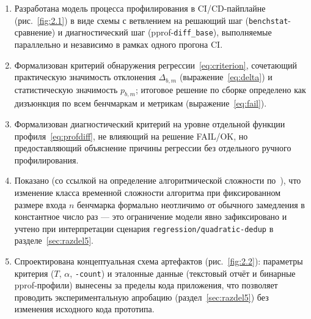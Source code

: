 \begin{enumerate}
\item Разработана модель процесса профилирования в CI/CD-пайплайне
(рис.~\ref{fig:2.1}) в виде схемы с ветвлением на решающий шаг
(\texttt{benchstat}-сравнение) и диагностический шаг (pprof-\texttt{diff\_base}),
выполняемые параллельно и независимо в рамках одного прогона CI.
\item Формализован критерий обнаружения регрессии~\eqref{eq:criterion},
сочетающий практическую значимость отклонения $\Delta_{b,m}$
(выражение~\eqref{eq:delta}) и статистическую значимость $p_{b,m}$; итоговое
решение по сборке определено как дизъюнкция по всем бенчмаркам и метрикам
(выражение~\eqref{eq:fail}).
\item Формализован диагностический критерий на уровне отдельной функции
профиля~\eqref{eq:profdiff}, не влияющий на решение FAIL/OK, но
предоставляющий объяснение причины регрессии без отдельного ручного
профилирования.
\item Показано (со ссылкой на определение алгоритмической сложности
по~\cite{clrs}), что изменение класса временной сложности алгоритма при
фиксированном размере входа $n$ бенчмарка формально неотличимо от обычного
замедления в константное число раз — это ограничение модели явно
зафиксировано и учтено при интерпретации сценария
\texttt{regression/\allowbreak quadratic-dedup} в разделе~\ref{sec:razdel5}.
\item Спроектирована концептуальная схема артефактов (рис.~\ref{fig:2.2}):
параметры критерия ($T$, $\alpha$, \texttt{-count}) и эталонные данные
(текстовый отчёт и бинарные pprof-профили) вынесены за пределы кода
приложения, что позволяет проводить экспериментальную апробацию
(раздел~\ref{sec:razdel5}) без изменения исходного кода прототипа.
\end{enumerate}
